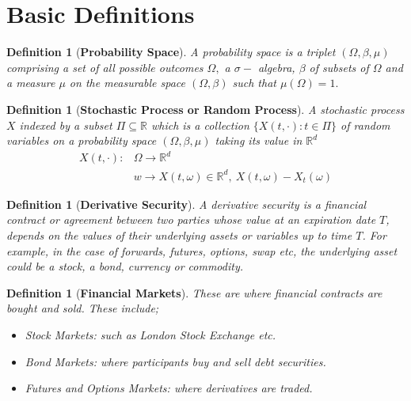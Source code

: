 \documentclass[a4 paper, 12pt]{report}
\theoremstyle{plain}
\newtheorem{definition}[theorem]{\textbf{Definition}}
\begin{document}
\section{Basic Definitions}
\begin{definition}[\textbf{Probability Space}]\label{121}
\normalfont
A probability space is a triplet $(\Omega,\beta, \mu)$ comprising a set of all possible outcomes $\Omega,$ a $\sigma-$ algebra, $\beta$ of subsets of $\Omega$ and a measure $\mu$ on the measurable space $(\Omega, \beta)$ such that $\mu(\Omega) = 1.$

\end{definition}

\begin{definition}[\textbf{Stochastic Process or Random Process}]\label{1222}
\normalfont
A stochastic process $X$ indexed by a subset $\Pi\subseteq\mathbb{R}$  which is a collection $\{X(t, \cdot) : t \in \Pi\}$ of random variables on a probability space $(\Omega, \beta, \mu)$ taking its value in $\mathbb{R}^d$
\begin{align*}
X(t,\cdot):&\Omega\rightarrow\mathbb{R}^d\\
&w\rightarrow X(t,\omega)\in\mathbb{R}^d,~X(t,\omega) - X_t(\omega)
\end{align*}
\end{definition}

\begin{definition}[\textbf{Derivative Security}]\label{123}
\normalfont
A derivative security is a financial contract or agreement between two parties whose value at an expiration date $T$, depends on the values of their underlying assets or variables up to time $T$. For example, in the case of forwards, futures, options, swap etc, the underlying asset could be a stock, a bond, currency or commodity.
\end{definition}

\begin{definition}[\textbf{Financial Markets}]\label{124}
\normalfont
These are where financial contracts are bought and sold. These include;
\begin{itemize}
\item Stock Markets: such as London Stock Exchange etc.
\item  Bond Markets: where participants buy and sell debt securities.
\item Futures and Options Markets: where derivatives are traded.
\end{itemize}

\end{definition}
\end{document}
